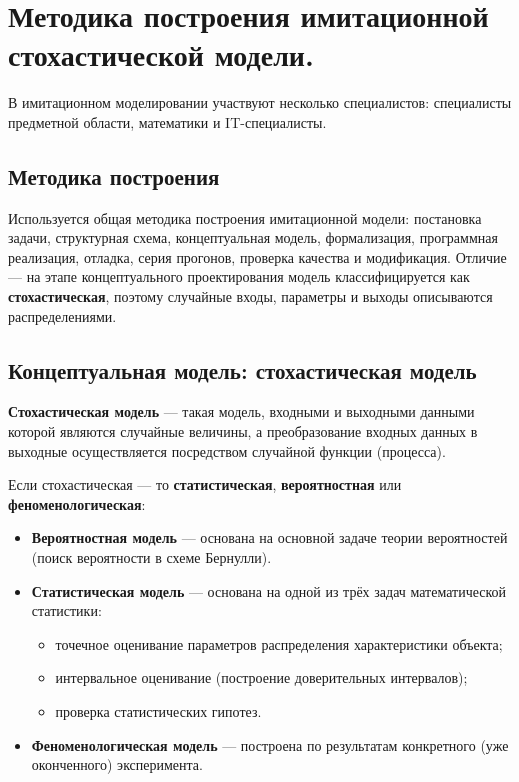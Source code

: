 \section{Методика построения имитационной стохастической модели.}

В имитационном моделировании участвуют несколько специалистов: специалисты предметной области, математики и IT-специалисты.

\subsection*{Методика построения}

Используется общая методика построения имитационной модели: постановка задачи, структурная схема, концептуальная модель, формализация, программная реализация, отладка, серия прогонов, проверка качества и модификация. Отличие — на этапе концептуального проектирования модель классифицируется как \textbf{стохастическая}, поэтому случайные входы, параметры и выходы описываются распределениями.

\subsection*{Концептуальная модель: стохастическая модель}

\textbf{Стохастическая модель} — такая модель, входными и выходными данными которой являются случайные величины, а преобразование входных данных в выходные осуществляется посредством случайной функции (процесса).

Если стохастическая — то \textbf{статистическая}, \textbf{вероятностная} или \textbf{феноменологическая}:

\begin{itemize}
  \item \textbf{Вероятностная модель} — основана на основной задаче теории вероятностей (поиск вероятности в схеме Бернулли).
  \item \textbf{Статистическая модель} — основана на одной из трёх задач математической статистики:
    \begin{itemize}
      \item точечное оценивание параметров распределения характеристики объекта;
      \item интервальное оценивание (построение доверительных интервалов);
      \item проверка статистических гипотез.
    \end{itemize}
  \item \textbf{Феноменологическая модель} — построена по результатам конкретного (уже оконченного) эксперимента.
\end{itemize}

